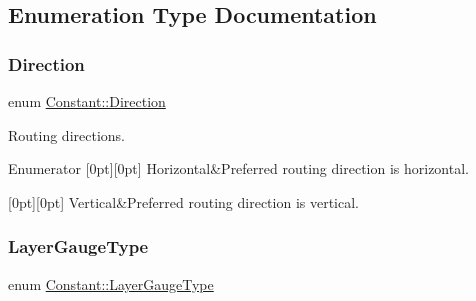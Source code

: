 \subsection{Enumeration Type Documentation}
\mbox{\label{namespaceConstant_ac081a99f2b64361919ed5d9f37c0f9af}} 
\subsubsection{\texorpdfstring{Direction}{Direction}}
{\footnotesize\ttfamily enum \hyperlink{namespaceConstant_ac081a99f2b64361919ed5d9f37c0f9af}{Constant\+::\+Direction}}

Routing directions. \begin{DoxyEnumFields}{Enumerator}
[0pt][0pt]{}\mbox{\label{namespaceConstant_ac081a99f2b64361919ed5d9f37c0f9afa7a545ff2d744fe30bfac294dfe9d03db}} 
Horizontal&Preferred routing direction is horizontal. \\
\hline

[0pt][0pt]{}\mbox{\label{namespaceConstant_ac081a99f2b64361919ed5d9f37c0f9afa63ce9cc57c99cccca96aa1157113da34}} 
Vertical&Preferred routing direction is vertical. \\
\hline

\end{DoxyEnumFields}
\mbox{\label{namespaceConstant_ab2e46a17cc373a268c5c24fa0e2067e5}} 
\subsubsection{\texorpdfstring{Layer\+Gauge\+Type}{LayerGaugeType}}
{\footnotesize\ttfamily enum \hyperlink{namespaceConstant_ab2e46a17cc373a268c5c24fa0e2067e5}{Constant\+::\+Layer\+Gauge\+Type}}

